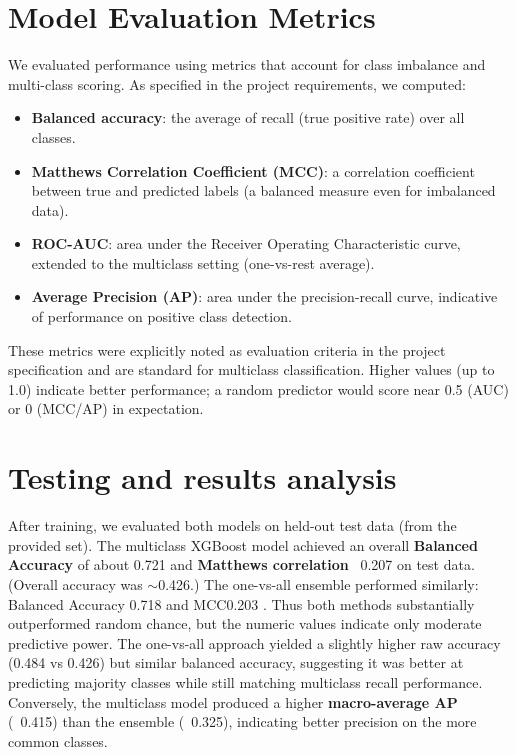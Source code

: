 \documentclass[10pt,twocolumn,letterpaper]{article}
\begin{document}
\section{Model Evaluation Metrics}
We evaluated performance using metrics that account for class imbalance and multi-class scoring.  As specified in the project requirements, we computed:
\begin{itemize}
\item {\bf Balanced accuracy}: the average of recall (true positive rate) over all classes.
\item {\bf Matthews Correlation Coefficient (MCC)}: a correlation coefficient between true and predicted labels (a balanced measure even for imbalanced data).
\item {\bf ROC-AUC}: area under the Receiver Operating Characteristic curve, extended to the multiclass setting (one-vs-rest average).
\item {\bf Average Precision (AP)}: area under the precision-recall curve, indicative of performance on positive class detection.
\end{itemize}
These metrics were explicitly noted as evaluation criteria in the project specification   and are standard for multiclass classification.  Higher values (up to 1.0) indicate better performance; a random predictor would score near 0.5 (AUC) or 0 (MCC/AP) in expectation.



\section{Testing and results analysis}
After training, we evaluated both models on held-out test data (from the provided set).  The multiclass XGBoost model achieved an overall \textbf{Balanced Accuracy} of about 0.721 and \textbf{Matthews correlation} ~0.207 on test data.  (Overall accuracy was $\sim$0.426.)  The one-vs-all ensemble performed similarly: Balanced Accuracy 0.718 and MCC0.203  .  Thus both methods substantially outperformed random chance, but the numeric values indicate only moderate predictive power.  The one-vs-all approach yielded a slightly higher raw accuracy (0.484 vs 0.426) but similar balanced accuracy, suggesting it was better at predicting majority classes while still matching multiclass recall performance.  Conversely, the multiclass model produced a higher \textbf{macro-average AP} (~0.415) than the ensemble (~0.325), indicating better precision on the more common classes.
\end{document}
